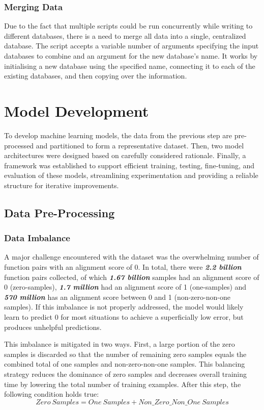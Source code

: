 
\subsubsection{Merging Data}
Due to the fact that multiple scripts could be run concurrently while writing to different databases, there is a need to merge all data into a single, centralized database. The script accepts a variable number of arguments specifying the input databases to combine and an argument for the new database's name. It works by initialising a new database using the specified name, connecting it to each of the existing databases, and then copying over the information.

\section{Model Development}
To develop machine learning models, the data from the previous step are pre-processed and partitioned to form a representative dataset. Then, two model architectures were designed based on carefully considered rationale. Finally, a framework was established to support efficient training, testing, fine-tuning, and evaluation of these models, streamlining experimentation and providing a reliable structure for iterative improvements.

\subsection{Data Pre-Processing}
\subsubsection{Data Imbalance} \label{Design:DataImbalance}
A major challenge encountered with the dataset was the overwhelming number of function pairs with an alignment score of 0. In total, there were \textbf{\textit{2.2 billion}} function pairs collected, of which \textbf{\textit{1.67 billion}} samples had an alignment score of 0 (zero-samples), \textbf{\textit{1.7 million}} had an alignment score of 1 (one-samples) and \textbf{\textit{570 million}} has an alignment score between 0 and 1 (non-zero-non-one samples). If this imbalance is not properly addressed, the model would likely learn to predict 0 for most situations to achieve a superficially low error, but produces unhelpful predictions.

This imbalance is mitigated in two ways. First, a large portion of the zero samples is discarded so that the number of remaining zero samples equals the combined total of one samples and non-zero-non-one samples. This balancing strategy reduces the dominance of zero samples and decreases overall training time by lowering the total number of training examples. After this step, the following condition holds true:
$$Zero\ Samples = One\ Samples + Non\_Zero\_Non\_One\ Samples$$

